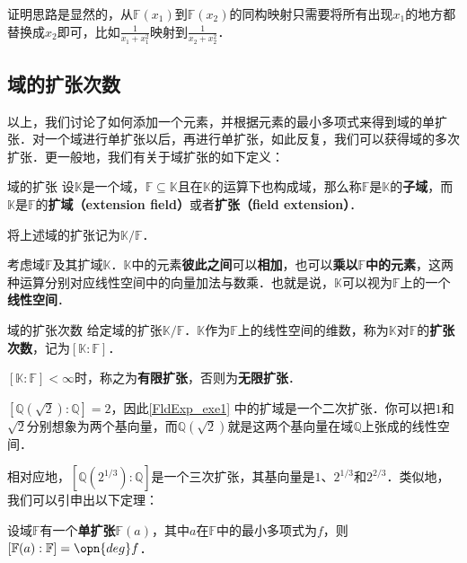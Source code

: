证明思路是显然的，从$\mathbb{F}(x_1)$到$\mathbb{F}(x_2)$的同构映射只需要将所有出现$x_1$的地方都替换成$x_2$即可，比如$\frac{1}{x_1+x_1^2}$映射到$\frac{1}{x_2+x_2^2}$．



\subsection{域的扩张次数}

以上，我们讨论了如何添加一个元素，并根据元素的最小多项式来得到域的单扩张．对一个域进行单扩张以后，再进行单扩张，如此反复，我们可以获得域的多次扩张．更一般地，我们有关于域扩张的如下定义：

\begin{definition}{域的扩张}
设$\mathbb{K}$是一个域，$\mathbb{F}\subseteq \mathbb{K}$且在$\mathbb{K}$的运算下也构成域，那么称$\mathbb{F}$是$\mathbb{K}$的\textbf{子域}，而$\mathbb{K}$是$\mathbb{F}$的\textbf{扩域（extension field）}或者\textbf{扩张（field extension）}．

将上述域的扩张记为$\mathbb{K}/\mathbb{F}$．
\end{definition}

考虑域$\mathbb{F}$及其扩域$\mathbb{K}$．$\mathbb{K}$中的元素\textbf{彼此之间}可以\textbf{相加}，也可以\textbf{乘以}$\mathbb{F}$\textbf{中的元素}，这两种运算分别对应线性空间中的向量加法与数乘．也就是说，$\mathbb{K}$可以视为$\mathbb{F}$上的一个\textbf{线性空间}．

\begin{definition}{域的扩张次数}
给定域的扩张$\mathbb{K}/\mathbb{F}$．$\mathbb{K}$作为$\mathbb{F}$上的线性空间的维数，称为$\mathbb{K}$对$\mathbb{F}$的\textbf{扩张次数}，记为$[\mathbb{K}:\mathbb{F}]$．

$[\mathbb{K}:\mathbb{F}]<\infty$时，称之为\textbf{有限扩张}，否则为\textbf{无限扩张}．
\end{definition}

$[\mathbb{Q}(\sqrt{2}):\mathbb{Q}]=2$，因此\autoref{FldExp_exe1} 中的扩域是一个二次扩张．你可以把$1$和$\sqrt{2}$分别想象为两个基向量，而$\mathbb{Q}(\sqrt{2})$就是这两个基向量在域$\mathbb{Q}$上张成的线性空间．

相对应地，$[\mathbb{Q}(2^{1/3}):\mathbb{Q}]$是一个三次扩张，其基向量是$1$、$2^{1/3}$和$2^{2/3}$．类似地，我们可以引申出以下定理：




\begin{theorem}{}\label{FldExp_the1}
设域$\mathbb{F}$有一个\textbf{单扩张}$\mathbb{F}(a)$，其中$a$在$\mathbb{F}$中的最小多项式为$f$，则$[\mathbb{F}(a):\mathbb{F}]=\opn{deg}f$．
\end{theorem}




